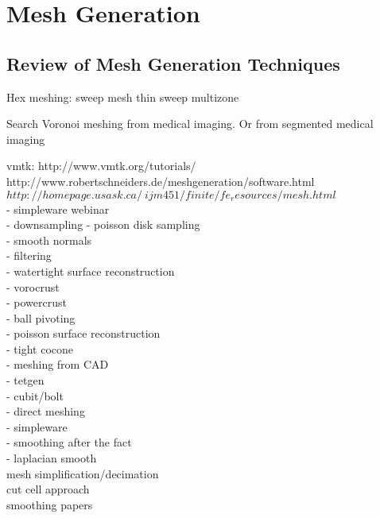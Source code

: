 \chapter{Mesh Generation}
%


\section{Review of Mesh Generation Techniques}
\label{Review of Mesh Generation Techniques}

Hex meshing:
sweep mesh
thin sweep
multizone

Search Voronoi meshing from medical imaging. Or from segmented medical imaging

vmtk: http://www.vmtk.org/tutorials/ \\

http://www.robertschneiders.de/meshgeneration/software.html \\

$http://homepage.usask.ca/~ijm451/finite/fe_resources/mesh.html$ \\

- simpleware webinar \\

- downsampling - poisson disk sampling\\
- smooth normals\\
- filtering\\

- watertight surface reconstruction\\
	- vorocrust\\
	- powercrust\\
	- ball pivoting\\
	- poisson surface reconstruction\\
	- tight cocone\\
	
- meshing from CAD\\
    - tetgen\\
    - cubit/bolt\\
    
- direct meshing\\
	- simpleware\\

- smoothing after the fact\\
	- laplacian smooth\\

mesh simplification/decimation\\
cut cell approach\\
smoothing papers\\

